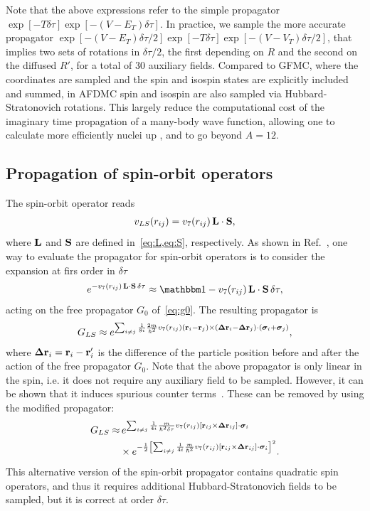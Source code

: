 \documentclass[aps,prc,twocolumn,superscriptaddress,floatfix]{revtex4-1}
\begin{document}
Note that the above expressions refer to the simple propagator $\exp[-T\delta\tau]\exp[-(V-E_T)\delta\tau]$.
In practice, we sample the more accurate propagator 
$\exp[-(V-E_T)\delta\tau/2]\exp[-T\delta\tau]\exp[-(V-V_T)\delta\tau/2]$, that implies
two sets of rotations in $\delta\tau/2$, the first depending on $R$ and the second on 
the diffused $R'$, for a total of 30 auxiliary fields.
Compared to GFMC, where the coordinates are sampled and the spin and isospin states are 
explicitly included and summed, in AFDMC spin and isospin are also sampled via 
Hubbard-Stratonovich rotations. This largely reduce the computational cost of the
imaginary time propagation of a many-body wave function, allowing one to calculate 
more efficiently nuclei up , and to go beyond $A=12$.


\subsection{Propagation of spin-orbit operators}
\label{sec:pls}
The spin-orbit operator reads
\begin{align}
v_{LS}(r_{ij})=v_7(r_{ij})\,\vb{L}\cdot\vb{S} ,
\end{align}
where $\vb{L}$ and $\vb{S}$ are defined in~\cref{eq:L,eq:S}, respectively.
As shown in Ref.~\cite{Pieper:1998}, one way to evaluate
the propagator for spin-orbit operators is to consider the expansion at firs order in $\delta\tau$
\begin{align}
	e^{-v_7(r_{ij})\,\vb{L}\cdot\vb{S}\,\delta\tau}\approx\mathbbm1-v_7(r_{ij})\,\vb{L}\cdot\vb{S}\,\delta\tau ,
\end{align}
acting on the free propagator $G_0$ of~\cref{eq:g0}.
The resulting propagator is
\begin{align}
G_{LS}\approx e^{\sum_{i\ne j}\frac{1}{8i}\frac{2m}{\hbar^2}v_7(r_{ij})(\vb{r}_i-\vb{r}_j)
\times(\bm\Delta\vb{r}_i-\bm\Delta\vb{r}_j)\cdot(\bm\sigma_i+\bm\sigma_j)} ,
\end{align}
where $\bm\Delta\vb{r}_i=\vb{r}_i-\vb{r}_i'$ is the difference of the particle position before and after the
action of the free propagator $G_0$.
Note that the above propagator is only linear in the spin, i.e. it does not require any
auxiliary field to be sampled.
However, it can be shown that it induces spurious counter terms~\cite{Sarsa:2003}.
These can be removed by using the modified propagator:
\begin{align}
G_{LS}\approx &\,e^{\sum_{i\neq j}\frac{1}{4i}\frac{m}{\hbar^2\delta\tau}v_7(r_{ij})
[\vb{r}_{ij}\times\bm\Delta\vb{r}_{ij}]\cdot\bm\sigma_i}
\nonumber \\
&\times e^{-\frac{1}{2}\left[\sum_{i\neq j}\frac{1}{4i}\frac{m}{\hbar^2}v_7(r_{ij})
[\vb{r}_{ij}\times\bm\Delta\vb{r}_{ij}]\cdot\bm\sigma_i\right]^2} .
\end{align}
This alternative version of the spin-orbit propagator contains quadratic spin operators,
and thus it requires additional Hubbard-Stratonovich fields to be sampled, but it is 
correct at order $\delta\tau$.
\end{document}
